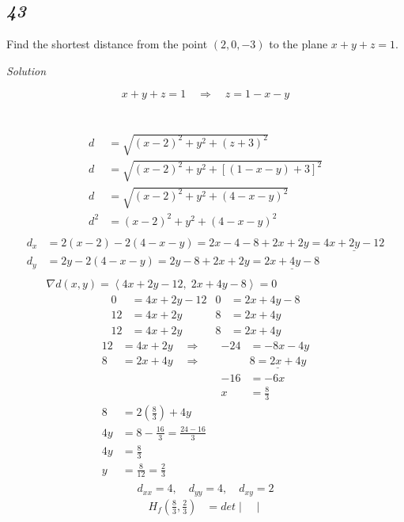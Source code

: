\documentclass{article}
\newcommand\vv[1]{\left\langle #1 \right\rangle}
\newcommand\rr{\quad\Rightarrow\quad}
\newcommand{\solution}{\centerline{\textit{Solution}}}
\newcommand{\bp}[1]{\left(#1\right)}
\newcommand{\also}{,\quad}
\begin{document}
{{{{{{{{{{{\begin{center}
    \subsection*{\textit{43}} 
Find the shortest distance from the point $(2,0,-3)$ to the plane $x+y+z=1$. 
\end{center}
\solution 
\[
    x + y + z = 1 \rr z = 1 - x - y
\] \\
 \\
\begin{align*}
    d &= \sqrt{(x-2)^2 + y^2 + (z+3)^2} \\
    d &= \sqrt{(x-2)^2 + y^2 + [(1 - x - y)+3]^2} \\
    d &= \sqrt{(x-2)^2 + y^2 + (4-x-y)^2} \\
    d^2 &= (x-2)^2 + y^2 + (4-x-y)^2 \\
\end{align*}
\begin{align*}
    d_x &= 2(x-2)-2(4-x-y) = 2x-4-8+2x+2y = \underline{4x+2y-12}\\
    d_y &= 2y-2(4-x-y) = 2y - 8 +2x + 2y = \underline{2x + 4y-8} \\\\
        &\nabla d(x,y) = \vv{4x + 2y - 12,\;2x+4y-8} = 0
\end{align*}
\begin{align*}
    0 &= 4x+2y-12 & 0 &= 2x+4y-8 \\
    12 &= 4x+2y & 8 &= 2x+4y \\
    12 &= 4x+2y & 8 &= 2x+4y
\end{align*}
\begin{align*}
    12 &= 4x+2y \rr& -24 &= -8x - 4y\\
    8 &= 2x+4y \rr& &\underline{8 = 2x + 4y}\\
      & & -16 &= -6x \\
      & & x &= \frac 8 3 \\
    8 &= 2\bp{\frac 8 3} + 4y \\
    4y &= 8 - \frac {16} 3 = \frac {24 - 16} 3 \\
    4y &=\frac {8} 3 \\
    y &=\frac {8}{12} = \frac 2 3 \\
\end{align*}
\[
    d_{xx}=4\also d_{yy}=4\also d_{xy}=2 
\]
\begin{align*}
    H_f(\frac 8 3,\frac 2 3) &= det\begin{vmatrix}

\end{vmatrix}
\end{align*}}}}}}}}}}}}
\end{document}
